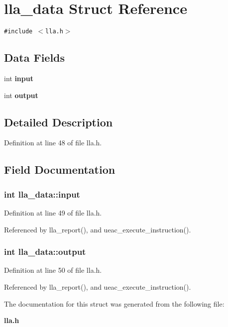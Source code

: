 \section{lla\_\-data Struct Reference}
\label{structlla__data}
{\tt \#include $<$lla.h$>$}

\subsection*{Data Fields}
\begin{CompactItemize}
\item 
int {\bf input}
\item 
int {\bf output}
\end{CompactItemize}


\subsection{Detailed Description}




Definition at line 48 of file lla.h.

\subsection{Field Documentation}
\subsubsection{\setlength{\rightskip}{0pt plus 5cm}int {\bf lla\_\-data::input}}\label{structlla__data_o0}




Definition at line 49 of file lla.h.

Referenced by lla\_\-report(), and ueac\_\-execute\_\-instruction().
\subsubsection{\setlength{\rightskip}{0pt plus 5cm}int {\bf lla\_\-data::output}}\label{structlla__data_o1}




Definition at line 50 of file lla.h.

Referenced by lla\_\-report(), and ueac\_\-execute\_\-instruction().

The documentation for this struct was generated from the following file:\begin{CompactItemize}
\item 
{\bf lla.h}\end{CompactItemize}
